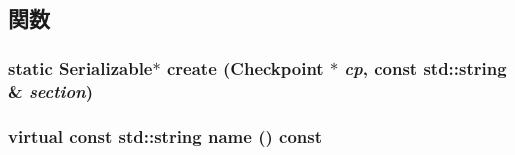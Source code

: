 \subsection{関数}
\hypertarget{classSerializable_aeba0ff4f3274e6aa0886adc5af90e371}{
\subsubsection[{create}]{\setlength{\rightskip}{0pt plus 5cm}static {\bf Serializable}$\ast$ create ({\bf Checkpoint} $\ast$ {\em cp}, \/  const std::string \& {\em section})}}
\label{classSerializable_aeba0ff4f3274e6aa0886adc5af90e371}
\hypertarget{classSerializable_a2d319721a65496069642871a52e47056}{
\subsubsection[{name}]{\setlength{\rightskip}{0pt plus 5cm}virtual const std::string name () const}}
\label{classSerializable_a2d319721a65496069642871a52e47056}


